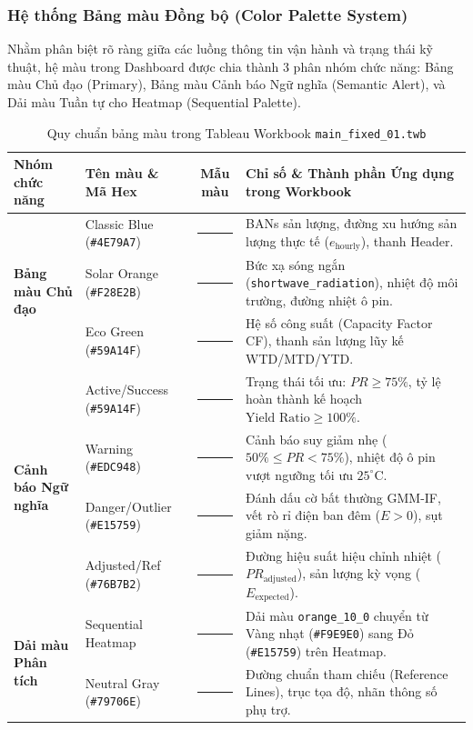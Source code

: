 \documentclass[12pt, a4paper]{report}
\begin{document}
\subsubsection{Hệ thống Bảng màu Đồng bộ (Color Palette System)}

Nhằm phân biệt rõ ràng giữa các luồng thông tin vận hành và trạng thái kỹ thuật, hệ màu trong Dashboard được chia thành 3 phân nhóm chức năng: Bảng màu Chủ đạo (Primary), Bảng màu Cảnh báo Ngữ nghĩa (Semantic Alert), và Dải màu Tuần tự cho Heatmap (Sequential Palette).

\begin{table}[H]
\centering
\caption{Quy chuẩn bảng màu trong Tableau Workbook \texttt{main\_fixed\_01.twb}}
\label{tab:tableau_color_system}
\small
\renewcommand{\arraystretch}{1.3}
\begin{tabularx}{\textwidth}{@{} l l c X @{}}
\toprule
\textbf{Nhóm chức năng} & \textbf{Tên màu \& Mã Hex} & \textbf{Mẫu màu} & \textbf{Chỉ số \& Thành phần Ứng dụng trong Workbook} \\
\midrule
\multirow{3}{*}{\textbf{Bảng màu Chủ đạo}} 
& Classic Blue (\texttt{\#4E79A7}) & \textcolor{tblNavy}{\rule{1.2cm}{0.3cm}} & BANs sản lượng, đường xu hướng sản lượng thực tế ($e_{\text{hourly}}$), thanh Header. \\
& Solar Orange (\texttt{\#F28E2B}) & \textcolor{tblOrange}{\rule{1.2cm}{0.3cm}} & Bức xạ sóng ngắn (\texttt{shortwave\_radiation}), nhiệt độ môi trường, đường nhiệt ô pin. \\
& Eco Green (\texttt{\#59A14F}) & \textcolor{tblGreen}{\rule{1.2cm}{0.3cm}} & Hệ số công suất (Capacity Factor CF), thanh sản lượng lũy kế WTD/MTD/YTD. \\
\midrule
\multirow{4}{*}{\textbf{Cảnh báo Ngữ nghĩa}}
& Active/Success (\texttt{\#59A14F}) & \textcolor{tblGreen}{\rule{1.2cm}{0.3cm}} & Trạng thái tối ưu: $PR \ge 75\%$, tỷ lệ hoàn thành kế hoạch $\text{Yield Ratio} \ge 100\%$. \\
& Warning (\texttt{\#EDC948}) & \textcolor{tblYellow}{\rule{1.2cm}{0.3cm}} & Cảnh báo suy giảm nhẹ ($50\% \le PR < 75\%$), nhiệt độ ô pin vượt ngưỡng tối ưu $25^\circ\text{C}$. \\
& Danger/Outlier (\texttt{\#E15759}) & \textcolor{tblRed}{\rule{1.2cm}{0.3cm}} & Đánh dấu cờ bất thường GMM-IF, vết rò rỉ điện ban đêm ($E > 0$), sụt giảm nặng. \\
& Adjusted/Ref (\texttt{\#76B7B2}) & \textcolor{tblTeal}{\rule{1.2cm}{0.3cm}} & Đường hiệu suất hiệu chỉnh nhiệt ($PR_{\text{adjusted}}$), sản lượng kỳ vọng ($E_{\text{expected}}$). \\
\midrule
\multirow{2}{*}{\textbf{Dải màu Phân tích}}
& Sequential Heatmap & \textcolor{tblSeqWarm}{\rule{1.2cm}{0.3cm}} & Dải màu \texttt{orange\_10\_0} chuyển từ Vàng nhạt (\texttt{\#F9E9E0}) sang Đỏ (\texttt{\#E15759}) trên Heatmap. \\
& Neutral Gray (\texttt{\#79706E}) & \textcolor{tblGray}{\rule{1.2cm}{0.3cm}} & Đường chuẩn tham chiếu (Reference Lines), trục tọa độ, nhãn thông số phụ trợ. \\
\bottomrule
\end{tabularx}


\end{table}
\end{document}

